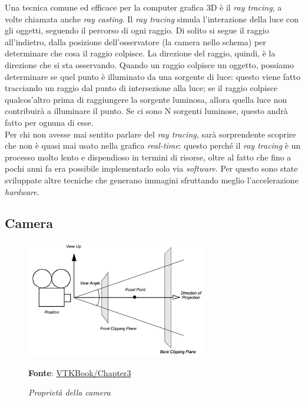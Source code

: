 Una tecnica comune ed efficace per la computer grafica 3D è il \emph{ray tracing}, a volte chiamata anche \emph{ray casting}. Il \emph{ray tracing} simula l'interazione della luce con gli oggetti, seguendo il percorso di ogni raggio. Di solito si segue il raggio all'indietro, dalla posizione dell'osservatore (la camera nello schema) per determinare che cosa il raggio colpisce. La direzione del raggio, quindi, è la direzione che si sta osservando. Quando un raggio colpisce un oggetto, possiamo determinare se quel punto è illuminato da una sorgente di luce: questo viene fatto tracciando un raggio dal punto di intersezione alla luce; se il raggio colpisce qualcos'altro prima di raggiungere la sorgente luminosa, allora quella luce non contribuirà a illuminare il punto. Se ci sono N sorgenti luminose, questo andrà fatto per ognuna di esse.
\\
Per chi non avesse mai sentito parlare del \emph{ray tracing}, sarà sorprendente scoprire che non è quasi mai usato nella grafica \emph{real-time}: questo perché il \emph{ray tracing} è un processo molto lento e dispendioso in termini di risorse, oltre al fatto che fino a pochi anni fa era possibile implementarlo solo via \emph{software}. Per questo sono state sviluppate altre tecniche che generano immagini sfruttando meglio l'accelerazione \emph{hardware}.

\subsection{Camera}
\begin{figure}[h]
    \centering
    \includegraphics[width=0.7\textwidth]{immagini/volumerendering/camera.png}
    \caption{\textit{Proprietà della camera}}
    \textbf{Fonte}: \href{https://lorensen.github.io/VTKExamples/site/VTKBook/03Chapter3/}{VTKBook/Chapter3}
    \label{fig: Proprietà Camera}
\end{figure}


